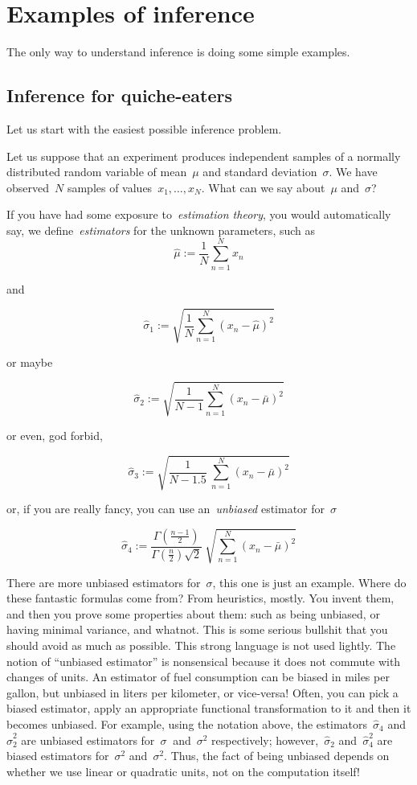 \section{Examples of inference}

The only way to understand inference is doing some simple examples.

\subsection{Inference for quiche-eaters}

Let us start with the easiest possible inference problem.

Let us suppose that an experiment produces independent samples of a normally
distributed random variable of mean~$\mu$ and standard deviation~$\sigma$.
We have observed~$N$ samples of values~$x_1,\ldots,x_N$.  What can we say
about~$\mu$ and~$\sigma$?

If you have had some exposure to~\emph{estimation theory}, you would
automatically say, we define~\emph{estimators} for the unknown parameters,
such as
$$
\hat\mu :=\frac{1}{N}\sum_{n=1}^N x_n
$$

and

$$
\hat\sigma_1 :=\sqrt{\frac{1}{N}\sum_{n=1}^N (x_n-\hat\mu)^2}
$$

or maybe

$$
\hat\sigma_2 :=\sqrt{\frac{1}{N-1}\sum_{n=1}^N (x_n-\bar\mu)^2}
$$

or even, god forbid,

$$
\hat\sigma_3 :=\sqrt{\frac{1}{N-1.5}\ \sum_{n=1}^N (x_n-\bar\mu)^2}
$$

or, if you are really fancy, you can use an~\emph{unbiased} estimator
for~$\sigma$

$$
\hat\sigma_4
:=\frac{\Gamma\left(\frac{n-1}{2}\right)}{\Gamma\left(\frac{n}{2}\right)\sqrt{2}}\ \sqrt{\sum_{n=1}^N (x_n-\bar\mu)^2}
$$

There are more unbiased estimators for~$\sigma$, this one is just an example.
Where do these fantastic formulas come from? From heuristics, mostly.  You
invent them, and then you prove some properties about them: such as being
unbiased, or having minimal variance, and whatnot.  This is some serious
bullshit that you should avoid as much as possible.  This strong language is
not used lightly.  The notion of ``unbiased estimator'' is
nonsensical because it does not commute with changes of units.  An estimator
of fuel consumption can be biased in miles per gallon, but unbiased in liters
per kilometer, or vice-versa!  Often, you can pick a biased estimator, apply
an appropriate functional transformation to it and then it becomes unbiased.
For example, using the notation above, the estimators~$\hat\sigma_4$
and~$\hat\sigma_2^2$ are unbiased estimators for~$\sigma~$ and~$\sigma^2$
respectively; however,~$\hat\sigma_2$ and~$\hat\sigma_4^2$ are biased
estimators for~$\sigma^2$ and~$\sigma^2$.  Thus, the fact of being unbiased
depends on whether we use linear or quadratic units, not on the computation
itself!

